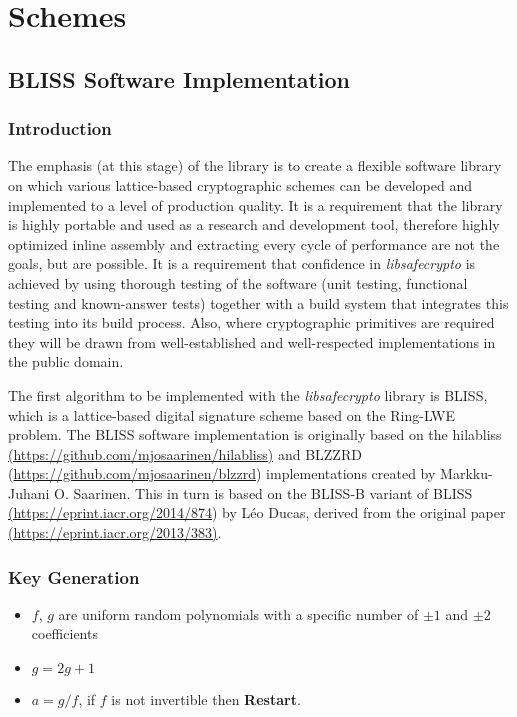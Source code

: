 \chapter{Schemes}

\section{BLISS Software Implementation}

\subsection{Introduction}
The emphasis (at this stage) of the library is to create a flexible software library on which various lattice-based cryptographic schemes can be developed and implemented to a level of production quality. It is a requirement that the library is highly portable and used as a research and development tool, therefore highly optimized inline assembly and extracting every cycle of performance are not the goals, but are possible. It is a requirement that confidence in \textit{libsafecrypto} is achieved by using thorough testing of the software (unit testing, functional testing and known-answer tests) together with a build system that integrates this testing into its build process. Also, where cryptographic primitives are required they will be drawn from well-established and well-respected implementations in the public domain.

The first algorithm to be implemented with the \textit{libsafecrypto} library is BLISS, which is a lattice-based digital signature scheme based on the Ring-LWE problem. The BLISS software implementation is originally based on the hilabliss \url{(https://github.com/mjosaarinen/hilabliss)} and BLZZRD (\url{https://github.com/mjosaarinen/blzzrd}) implementations created by Markku-Juhani O. Saarinen. This in turn is based on the BLISS-B variant of BLISS \url{(https://eprint.iacr.org/2014/874}) by Léo Ducas, derived from the original paper \url{(https://eprint.iacr.org/2013/383)}.

\subsection{Key Generation}

\begin{itemize}
\item $f$, $g$ are uniform random polynomials with a specific number of $\pm 1$ and $\pm 2$ coefficients
\item $g = 2g + 1$
\item $a = g / f$, if $f$ is not invertible then \textbf{Restart}.
\end{itemize}

